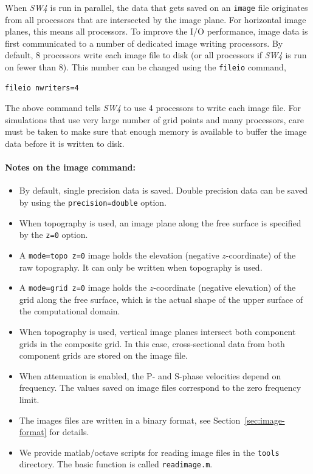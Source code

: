 \documentclass[11pt]{report}
\begin{document}
{When \emph{SW4} is run in parallel, the data that gets saved on an {\tt image} file originates from
all processors that are intersected by the image plane. For horizontal image planes, this means all
processors. To improve the I/O performance, image data is first communicated to a number of
dedicated image writing processors. By default, 8 processors write each image file to disk (or all
processors if \emph{SW4} is run on fewer than 8). This number can be changed using the {\tt fileio}
command,
\begin{verbatim}
fileio nwriters=4
\end{verbatim}
The above command tells \emph{SW4} to use 4 processors to write each image file. For simulations
that use very large number of grid points and many processors, care must be taken to make sure that
enough memory is available to buffer the image data before it is written to disk.

\paragraph{Notes on the image command:}
\begin{itemize}
	\item By default, single precision data is saved. Double precision data can be saved by
	      using the {\tt precision=double} option.
	\item When topography is used, an image plane along the free surface is specified by the {\tt z=0} option.
	\item A {\tt mode=topo z=0} image holds the elevation (negative $z$-coordinate) of the raw
	      topography. It can only be written when topography is used.
	\item A {\tt mode=grid z=0} image holds the $z$-coordinate (negative elevation) of the grid along
	      the free surface, which is the actual shape of the upper surface of the computational domain.
	\item When topography is used, vertical image planes intersect both component
	      grids in the composite grid. In this case, cross-sectional data from both component grids are stored
	      on the image file.
	\item When attenuation is enabled, the P- and S-phase velocities depend on frequency. The values
	      saved on image files correspond to the zero frequency limit.
	\item The images files are written in a binary format, see Section~\ref{sec:image-format} for
	      details.
	\item We provide matlab/octave scripts for reading image files in the {\tt tools} directory. The
	      basic function is called {\tt readimage.m}.
\end{itemize}

}
\end{document}
